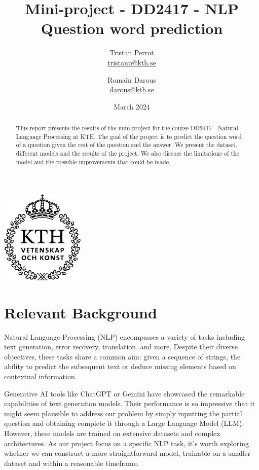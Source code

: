 \documentclass{article}
\title{Mini-project - DD2417 - NLP \\ Question word prediction}
\author{
    Tristan Perrot \\ \href{mailto:tristanp@kth.se}{tristanp@kth.se}
    \and Romain Darous \\ \href{mailto:darous@kth.se}{darous@kth.se}
}
\date{March 2024}
\begin{document}
\maketitle
\begin{center}
    \includegraphics[width = 40mm]{images/KTH_logo_RGB_svart.png}
\end{center}

\begin{abstract}
    This report presents the results of the mini-project for the course DD2417 - Natural Language Processing at KTH. The goal of the project is to predict the question word of a question given the rest of the question and the answer. We present the dataset, different models and the results of the project. We also discuss the limitations of the model and the possible improvements that could be made.
\end{abstract}

\section{Relevant Background}

Natural Language Processing (NLP) encompasses a variety of tasks including text generation, error recovery, translation, and more. Despite their diverse objectives, these tasks share a common aim: given a sequence of strings, the ability to predict the subsequent text or deduce missing elements based on contextual information.

Generative AI tools like ChatGPT or Gemini have showcased the remarkable capabilities of text generation models. Their performance is so impressive that it might seem plausible to address our problem by simply inputting the partial question and obtaining complete it through a Large Language Model (LLM). However, these models are trained on extensive datasets and complex architectures. As our project focus on a specific NLP task, it's worth exploring whether we can construct a more straightforward model, trainable on a smaller dataset and within a reasonable timeframe.
\end{document}

